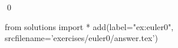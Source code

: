 
\begin{ex} 
  \label{ex:euler0}
  
  \qed
\end{ex} 
\begin{python0}
from solutions import *
add(label="ex:euler0",
    srcfilename='exercises/euler0/answer.tex') 
\end{python0}
